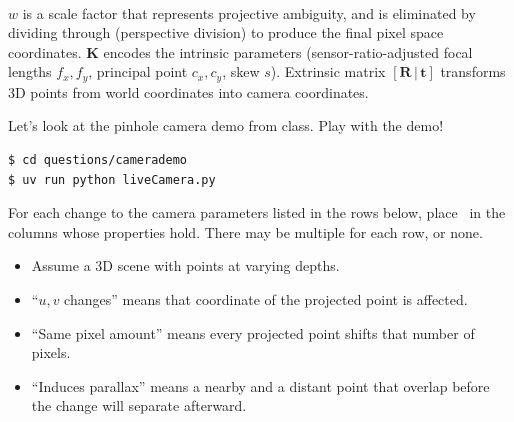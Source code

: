 \documentclass{csci1430}
\begin{document}
\begin{question}[points=8,drawbox=false]
\begin{equation}
\begin{aligned}
\end{aligned}
\end{equation}
%
$w$ is a scale factor that represents projective ambiguity, and is eliminated by dividing through (perspective division) to produce the final pixel space coordinates. $\mathbf{K}$ encodes the intrinsic parameters (sensor-ratio-adjusted focal lengths $f_x, f_y$, principal point $c_x, c_y$, skew $s$). Extrinsic matrix $[\mathbf{R}\,|\,\mathbf{t}]$ transforms 3D points from world coordinates into camera coordinates.
\end{question}

\pagebreak

\begin{subquestion}[points=5]
Let's look at the pinhole camera demo from class. Play with the demo!
\begin{verbatim}
$ cd questions/camerademo
$ uv run python liveCamera.py
\end{verbatim}

For each change to the camera parameters listed in the rows below, place \filled~in the columns whose properties hold. There may be multiple for each row, or none.

\begin{itemize}[leftmargin=12pt]
    \item Assume a 3D scene with points at varying depths.
    \item ``$u,v$ changes'' means that coordinate of the projected point is affected.
    \item ``Same pixel amount'' means every projected point shifts that number of pixels.
    \item ``Induces parallax'' means a nearby and a distant point that overlap before the change will separate afterward.
\end{itemize}
\end{subquestion}
\end{document}
